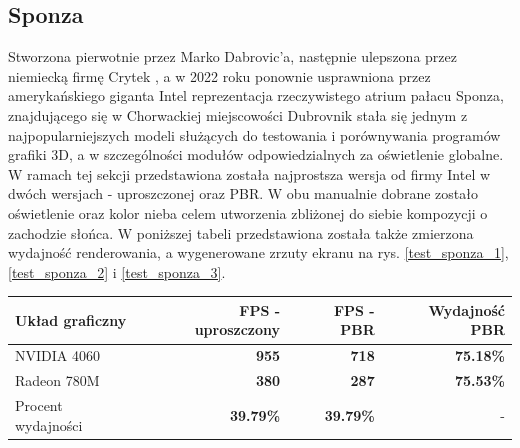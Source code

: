 \subsection{Sponza}
Stworzona pierwotnie przez Marko Dabrovic'a, następnie ulepszona przez niemiecką firmę Crytek \cite{github:Khronos:Sponza}, a w 2022 roku ponownie usprawniona przez amerykańskiego giganta Intel \cite{Intel:GPUResearch:Sponza} reprezentacja rzeczywistego atrium pałacu Sponza, znajdującego się w Chorwackiej miejscowości Dubrovnik stała się jednym z najpopularniejszych modeli służących do testowania i porównywania programów grafiki 3D, a w szczególności modułów odpowiedzialnych za oświetlenie globalne. W ramach tej sekcji przedstawiona została najprostsza wersja od firmy Intel w dwóch wersjach - uproszczonej oraz PBR. W obu manualnie dobrane zostało oświetlenie oraz kolor nieba celem utworzenia zbliżonej do siebie kompozycji o zachodzie słońca. W poniższej tabeli przedstawiona została także zmierzona wydajność renderowania, a wygenerowane zrzuty ekranu na rys. \ref{test_sponza_1}, \ref{test_sponza_2} i \ref{test_sponza_3}.

\begin{center}
	\begin{tabular}{ |l r r r|}
		\hline
		\textbf{Układ graficzny} & \textbf{FPS - uproszczony} & \textbf{FPS - PBR} & \textbf{Wydajność PBR} \\
		\hline
		NVIDIA 4060 & \textbf{955} & \textbf{718} & \textbf{75.18\%} \\
		Radeon 780M & \textbf{380} & \textbf{287} & \textbf{75.53\%} \\
		Procent wydajności & \textbf{39.79\%} & \textbf{39.79\%} & - \\
		\hline
	\end{tabular}
\end{center}
	
